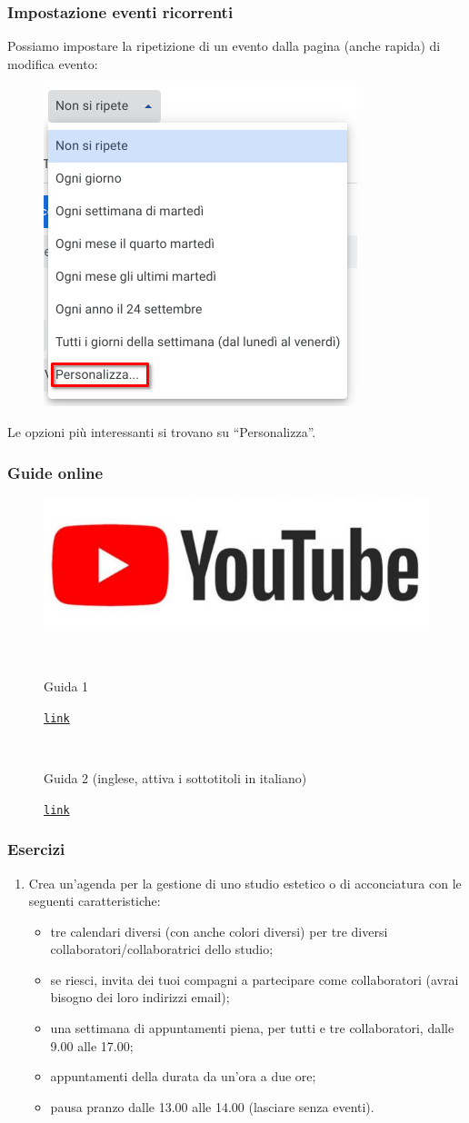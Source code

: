 \documentclass[handout]{beamer}
\begin{document}
\begin{frame}
\frametitle{Impostazione eventi ricorrenti}
Possiamo impostare la ripetizione di un evento dalla pagina (anche rapida) di modifica evento:
\begin{figure}
  \includegraphics[width=.4\columnwidth]{img/calendarricorrente.png}
\end{figure}
Le opzioni più interessanti si trovano su ``Personalizza''.
\end{frame}




\begin{frame}
\frametitle{Guide online}
\begin{figure}
\includegraphics[width=.5\columnwidth]{img/ytlogo.jpg}

~

Guida 1

\href{link}{\texttt{link}}

~

Guida 2 (inglese, attiva i sottotitoli in italiano)

\href{link}{\texttt{link}}
\end{figure}
\end{frame}



\begin{frame}
\frametitle{Esercizi}
\begin{enumerate}
  \item Crea un'agenda per la gestione di uno studio estetico o di acconciatura con le seguenti caratteristiche:
  \begin{itemize}
    \item tre calendari diversi (con anche colori diversi) per tre diversi collaboratori/collaboratrici dello studio;
    \item se riesci, invita dei tuoi compagni a partecipare come collaboratori (avrai bisogno dei loro indirizzi email);
    \item una settimana di appuntamenti piena, per tutti e tre collaboratori, dalle 9.00 alle 17.00;
    \item appuntamenti della durata da un'ora a due ore;
    \item pausa pranzo dalle 13.00 alle 14.00 (lasciare senza eventi).
  \end{itemize}
\end{enumerate}
\end{frame}
\end{document}
